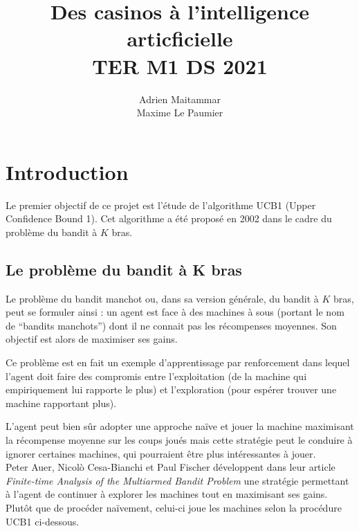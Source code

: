 \documentclass[a4paper]{article}
\title{\huge Des casinos à l'intelligence articficielle\\[15pt] \small TER M1 DS 2021}
\author{Adrien Maitammar \\ Maxime Le Paumier}
\theoremstyle{definition}
\begin{document}
\maketitle

\vspace{30pt}

\renewcommand{\contentsname}{Sommaire}
\tableofcontents
 \clearpage
 
 
\section{Introduction}

\vspace{5pt}

Le premier objectif de ce projet est l'étude de l'algorithme UCB1 (Upper Confidence Bound 1). Cet algorithme a été proposé en 2002 dans le cadre du problème du bandit à $K$ bras.

\subsection{Le problème du bandit à K bras}

Le problème du bandit manchot ou, dans sa version générale, du bandit à $K$ bras, peut se formuler ainsi : un agent est face à des machines à sous (portant le nom de ``bandits manchots'') dont il ne connait pas les récompenses moyennes. Son objectif est alors de maximiser ses gains.

Ce problème est en fait un exemple d'apprentissage par renforcement dans lequel l'agent doit faire des compromis entre l'exploitation (de la machine qui empiriquement lui rapporte le plus) et l'exploration (pour espérer trouver une machine rapportant plus).

L'agent peut bien sûr adopter une approche naïve et jouer la machine maximisant la récompense moyenne sur les coups joués mais  cette stratégie peut le conduire à ignorer certaines machines, qui pourraient être plus intéressantes à jouer. \\
 
Peter Auer, Nicol\`o Cesa-Bianchi et Paul Fischer développent dans leur article \textit{Finite-time Analysis of the Multiarmed Bandit
Problem} une stratégie permettant à l'agent de continuer à explorer les machines tout en maximisant ses gains. Plutôt que de procéder naïvement, celui-ci joue les machines selon la procédure UCB1 ci-dessous.

\vspace{10pt}
\end{document}
